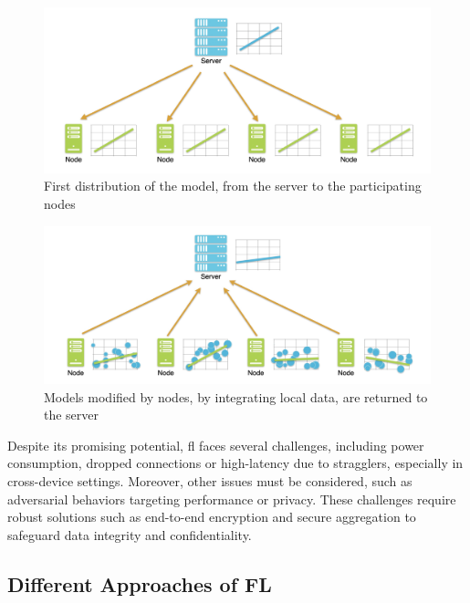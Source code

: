 \documentclass[conference]{IEEEtran}
\begin{document}
\begin{figure}[t]
    \centering
    \includegraphics[width=\linewidth]{img/FL-phase1.jpg}
    \vspace*{-.8cm}
    \caption{First distribution of the model, from the server to the participating nodes}
    \label{fig:fl-phase1}
\end{figure}

\begin{figure}[t]
    \centering
    \vspace*{-.4cm}
    \includegraphics[width=\linewidth]{img/FL-phase2.jpg}
    \vspace*{-.8cm}
    \caption{Models modified by nodes, by integrating local data, are returned to the server}
    \label{fig:fl-phase2}
\end{figure}

Despite its promising potential, \gls{fl} faces several challenges, including power consumption, dropped connections or high-latency due to stragglers, especially in cross-device settings.
Moreover, other issues must be considered, such as adversarial behaviors targeting performance or privacy.
These challenges require robust solutions such as end-to-end encryption and secure aggregation to safeguard data integrity and confidentiality.

\subsection{Different Approaches of FL}
\end{document}
